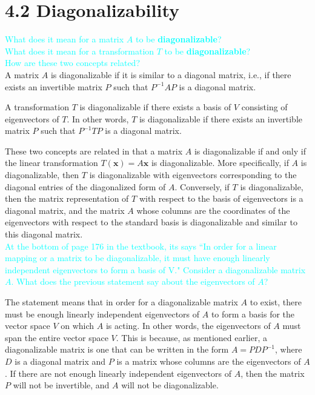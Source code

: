 \documentclass[fontsize=12pt]{scrartcl}
\begin{document}
\newpage

\section{4.2 Diagonalizability}

\bigskip

\noindent
\textcolor{cyan}{What does it mean for a matrix $A$ to be \textbf{diagonalizable}?}\\
\textcolor{cyan}{What does it mean for a transformation $T$ to be \textbf{diagonalizable}?}\\
\textcolor{cyan}{How are these two concepts related?}\\

\noindent
A matrix $A$ is diagonalizable if it is similar to a diagonal matrix, i.e., if there exists an invertible matrix $P$ such that $P^{-1}AP$ is a diagonal matrix.

\noindent
A transformation $T$ is diagonalizable if there exists a basis of $V$ consisting of eigenvectors of $T$. In other words, $T$ is diagonalizable if there exists an invertible matrix $P$ such that $P^{-1}TP$ is a diagonal matrix.

\noindent
These two concepts are related in that a matrix $A$ is diagonalizable if and only if the linear transformation $T(\mathbf{x})=A\mathbf{x}$ is diagonalizable. More specifically, if $A$ is diagonalizable, then $T$ is diagonalizable with eigenvectors corresponding to the diagonal entries of the diagonalized form of $A$. Conversely, if $T$ is diagonalizable, then the matrix representation of $T$ with respect to the basis of eigenvectors is a diagonal matrix, and the matrix $A$ whose columns are the coordinates of the eigenvectors with respect to the standard basis is diagonalizable and similar to this diagonal matrix.
\\

\noindent
\textcolor{cyan}{At the bottom of page 176 in the textbook, its says ``In order for a linear mapping or a matrix to be diagonalizable, it must have enough linearly independent eigenvectors to form a basis of V." Consider a diagonalizable matrix $A$. What does the previous statement say about the eigenvectors of $A$?}

\noindent
The statement means that in order for a diagonalizable matrix $A$ to exist, there must be enough linearly independent eigenvectors of $A$ to form a basis for the vector space $V$ on which $A$ is acting. In other words, the eigenvectors of $A$ must span the entire vector space $V$. This is because, as mentioned earlier, a diagonalizable matrix is one that can be written in the form $A = PDP^{-1}$, where $D$ is a diagonal matrix and $P$ is a matrix whose columns are the eigenvectors of $A$. If there are not enough linearly independent eigenvectors of $A$, then the matrix $P$ will not be invertible, and $A$ will not be diagonalizable.
\end{document}
